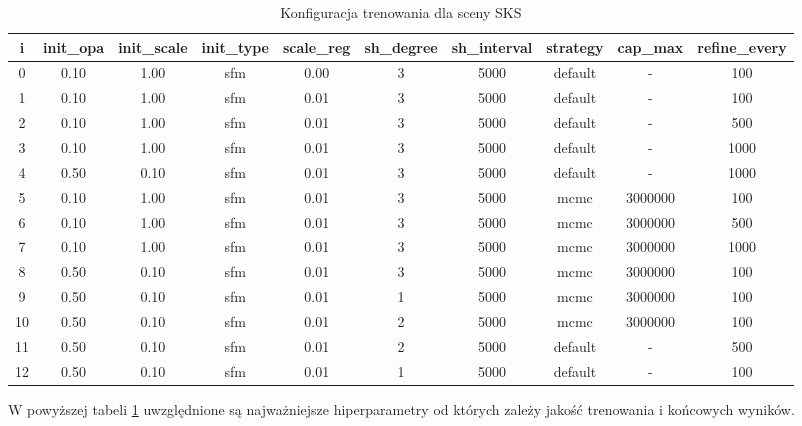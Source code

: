 \begin{table}[!h]
    \centering
    \begin{tabular}{|c|c|c|c|c|c|c|c|c|c|}
    \hline
    i & init\_opa & init\_scale & init\_type & scale\_reg & sh\_degree & sh\_interval & strategy & cap\_max & refine\_every \\
    \hline
    0 & 0.10 & 1.00 & sfm & 0.00 & 3 & 5000 & default & - & 100 \\
    \hline
    1 & 0.10 & 1.00 & sfm & 0.01 & 3 & 5000 & default & - & 100 \\
    \hline
    2 & 0.10 & 1.00 & sfm & 0.01 & 3 & 5000 & default & - & 500 \\
    \hline
    3 & 0.10 & 1.00 & sfm & 0.01 & 3 & 5000 & default & - & 1000 \\
    \hline
    4 & 0.50 & 0.10 & sfm & 0.01 & 3 & 5000 & default & - & 1000 \\
    \hline
    5 & 0.10 & 1.00 & sfm & 0.01 & 3 & 5000 & mcmc & 3000000 & 100 \\
    \hline
    6 & 0.10 & 1.00 & sfm & 0.01 & 3 & 5000 & mcmc & 3000000 & 500 \\
    \hline
    7 & 0.10 & 1.00 & sfm & 0.01 & 3 & 5000 & mcmc & 3000000 & 1000 \\
    \hline
    8 & 0.50 & 0.10 & sfm & 0.01 & 3 & 5000 & mcmc & 3000000 & 100 \\
    \hline
    9 & 0.50 & 0.10 & sfm & 0.01 & 1 & 5000 & mcmc & 3000000 & 100 \\
    \hline
    10 & 0.50 & 0.10 & sfm & 0.01 & 2 & 5000 & mcmc & 3000000 & 100 \\
    \hline
    11 & 0.50 & 0.10 & sfm & 0.01 & 2 & 5000 & default & - & 500 \\
    \hline
    12 & 0.50 & 0.10 & sfm & 0.01 & 1 & 5000 & default & - & 100 \\
    \hline
    \end{tabular}
    \caption{Konfiguracja trenowania dla sceny SKS}
    \label{table:tab_conf_sks}
\end{table}

W powyższej tabeli \ref{table:tab_conf_sks} uwzględnione są najważniejsze hiperparametry od których zależy jakość trenowania i końcowych wyników. 

